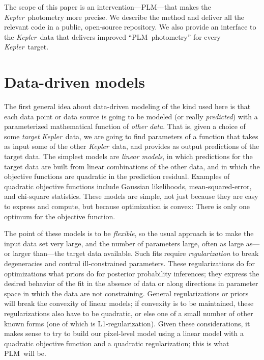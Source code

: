 \documentclass[12pt, preprint]{aastex}
\newcommand{\project}[1]{\textsl{#1}}
\newcommand{\Kepler}{\project{Kepler}}
\newcommand{\name}{PLM}
\begin{document}
The scope of this paper is an intervention---\name---that makes the \Kepler\ photometry more precise.
We describe the method and deliver all the relevant code in a public, open-source repository.
We also provide an interface to the \Kepler\ data that delivers improved ``\name\ photometry''
  for every \Kepler\ target.

\section{Data-driven models}

The first general idea about data-driven modeling of the kind used here
  is that each data point or data source is going to be modeled
  (or really \emph{predicted})
  with a parameterized mathematical function of \emph{other data}.
That is, given a choice of some \emph{target} \Kepler\ data,
  we are going to find parameters of a function that takes as input some of the other \Kepler\ data,
  and provides as output predictions of the target data.
The simplest models are \emph{linear models},
  in which predictions for the target data are built from linear combinations of the other data,
  and in which the objective functions are quadratic in the prediction residual.
Examples of quadratic objective functions include Gaussian likelihoods, mean-squared-error, and chi-square statistics.
These models are simple,
  not just because they are easy to express and compute,
  but because optimization is convex:
There is only one optimum for the objective function.

The point of these models is to be \emph{flexible},
  so the usual approach is to make the input data set very large,
  and the number of parameters large,
  often as large as---or larger than---the target data available.
Such fits require \emph{regularization} to break degeneracies
  and control ill-constrained parameters.
These regularizations do for optimizations what priors do for posterior probability inferences;
  they express the desired behavior of the fit in the absence of data
  or along directions in parameter space in which the data are not constraining.
General regularizations or priors will break the convexity of linear models;
  if convexity is to be maintained, these regularizations also have to be quadratic,
  or else one of a small number of other known forms (one of which is L1-regularization).
Given these considerations, it makes sense to try to build our pixel-level model
  using a linear model with a quadratic objective function and a quadratic regularization;
  this is what \name\ will be.
\end{document}
